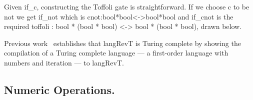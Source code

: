 \documentclass{llncs}
\begin{document}
Given {{if_c}}, constructing the Toffoli gate is straightforward. If
we choose {{c}} to be {{not}} we get {{if_{not} }} which is
{{cnot:bool*bool<->bool*bool}} and {{if_{cnot} }} is the required
{{toffoli : bool * (bool * bool) <-> bool * (bool * bool)}}, drawn
below.
\begin{center}
\end{center}
\noindent Previous work~\cite[Sec.~5]{James:2012:IE:2103656.2103667}
establishes that {{langRevT}} is Turing complete by showing the compilation
of a Turing complete language --- a first-order language with numbers and
iteration --- to {{langRevT}}.

\subsection{Numeric Operations.}
\label{sec:numeric-ops}
\end{document}

